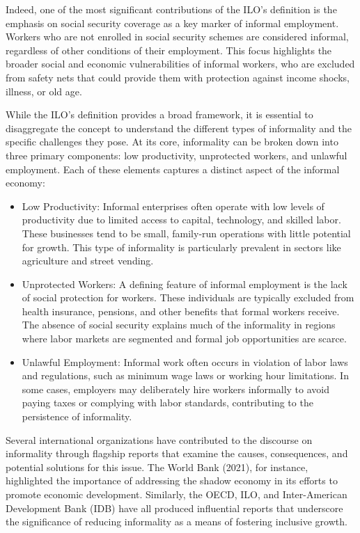 \documentclass[english]{article}
\begin{document}
Indeed, one of the most significant contributions of the ILO’s definition is the emphasis on social security coverage as a key marker of informal employment. Workers who are not enrolled in social security schemes are considered informal, regardless of other conditions of their employment. This focus highlights the broader social and economic vulnerabilities of informal workers, who are excluded from safety nets that could provide them with protection against income shocks, illness, or old age.

While the ILO’s definition provides a broad framework, it is essential to disaggregate the concept to understand the different types of informality and the specific challenges they pose. At its core, informality can be broken down into three primary components: low productivity, unprotected workers, and unlawful employment. Each of these elements captures a distinct aspect of the informal economy:
\begin{itemize}
\item Low Productivity: Informal enterprises often operate with low levels of productivity due to limited access to capital, technology, and skilled labor. These businesses tend to be small, family-run operations with little potential for growth. This type of informality is particularly prevalent in sectors like agriculture and street vending.

 \item Unprotected Workers: A defining feature of informal employment is the lack of social protection for workers. These individuals are typically excluded from health insurance, pensions, and other benefits that formal workers receive. The absence of social security explains much of the informality in regions where labor markets are segmented and formal job opportunities are scarce.

 \item Unlawful Employment: Informal work often occurs in violation of labor laws and regulations, such as minimum wage laws or working hour limitations. In some cases, employers may deliberately hire workers informally to avoid paying taxes or complying with labor standards, contributing to the persistence of informality.
   
\end{itemize}


Several international organizations have contributed to the discourse on informality through flagship reports that examine the causes, consequences, and potential solutions for this issue. The World Bank (2021), for instance, highlighted the importance of addressing the shadow economy in its efforts to promote economic development. Similarly, the OECD, ILO, and Inter-American Development Bank (IDB) have all produced influential reports that underscore the significance of reducing informality as a means of fostering inclusive growth.
\end{document}
